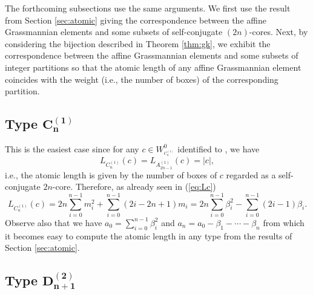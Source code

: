 \documentclass[pdftex]{sigma}
\numberwithin{equation}{section}
\begin{document}

%

The forthcoming subsections use the same arguments. We first use the result
from Section \ref{sec:atomic} giving the correspondence between the affine
Grassmannian elements and some subsets of self-conjugate $(2n)$-cores. Next,
by considering the bijection described in Theorem \ref{thm:gk}, we exhibit
the correspondence between the affine Grassmannian elements and some subsets
of integer partitions so that the atomic length of any affine Grassmannian
element coincides with the weight (i.e., the number of boxes) of the
corresponding partition.

\subsection[Type C\_n\^{}(1)]{Type $\boldsymbol{C_{n}^{(1)}}$}

This is the easiest case since for any $c\in W_{^{C_{n}^{(1)}}}^{0}$ identified to , we have
\[
L_{C_{n}^{(1)}}(c)=L_{A_{2n-1}^{(1)}}(c)= \vert c \vert ,
\] i.e., the
atomic length is given by the number of boxes of $c$ regarded as a
self-conjugate $2n$-core. Therefore, as already seen in (\ref{eq:Lc})%
\begin{equation*}
L_{C_{n}^{(1)}}(c)=2n\sum_{i=0}^{n-1}m_{i}^{2}+%
\sum_{i=0}^{n-1}(2i-2n+1)m_{i}=2n\sum_{i=0}^{n-1}\beta
_{i}^{2}-\sum_{i=0}^{n-1}(2i-1)\beta _{i}. %
\end{equation*}%
Observe also that we have $a_{0}=\sum_{i=0}^{n-1}\beta _{i}^{2}$ and $%
a_{n}=a_{0}-\beta _{1}-\cdots -\beta _{n}$ from which it becomes easy to
compute the atomic length in any type from the results of Section \ref{sec:atomic}.

\subsection[Type D\_\{n+1\}\^{}(2)]{Type $\boldsymbol{D_{n+1}^{(2)}}$}
\end{document}
